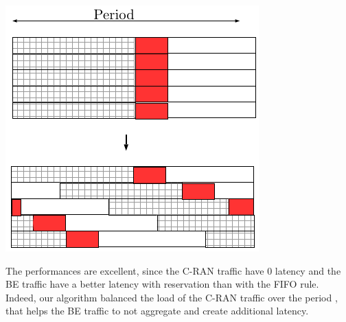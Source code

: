 \documentclass[]{algotel}
\begin{document}
    \begin{minipage}[b]{0.30\linewidth}
        \begin{center}
      \includegraphics[scale=0.55]{repart1}
      \vspace{1cm}
          \label{fig:repart2}
      \end{center} 
  \end{minipage}
   




  The performances are excellent, since the C-RAN traffic have $0$ latency and the BE traffic have a better latency with reservation than with the FIFO rule. Indeed, our algorithm balanced the load of the C-RAN traffic over the period , that helps the BE traffic to not aggregate and create additional latency.

  
\end{document}
